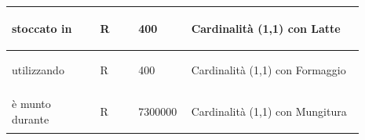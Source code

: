 \documentclass[12pt,a4paper]{article}
\begin{document}
\begin{center}
\begin{longtable}{|p{0.23\linewidth}|p{0.1\linewidth}|p{0.11\linewidth}|p{0.45\linewidth}|}
\hline
stoccato in 				& \begin{center}
\vspace{-25pt}R
\end{center}
					& \begin{center}
					\vspace{-25pt}400\end{center}
					& \begin{flushleft}\vspace{-25pt} Cardinalità (1,1) con Latte \end{flushleft}\\ 

\hline
utilizzando 				& \begin{center}
\vspace{-25pt}R
\end{center}
					& \begin{center}
					\vspace{-25pt}400\end{center}
					& \begin{flushleft}\vspace{-25pt} Cardinalità (1,1) con Formaggio \end{flushleft}\\ 

\hline
è munto durante 				& \begin{center}
\vspace{-25pt}R
\end{center}
					& \begin{center}
					\vspace{-25pt}7300000\end{center}
					& \begin{flushleft}\vspace{-25pt}  Cardinalità (1,1) con Mungitura\end{flushleft} \\

\hline

\end{longtable}\end{center}
\end{document}
